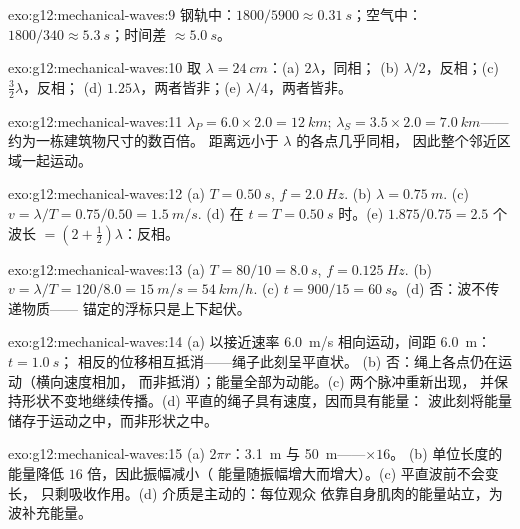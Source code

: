\begin{solution}{exo:g12:mechanical-waves:9}
钢轨中：$1800/5900 \approx \qty{0.31}{s}$；空气中：
$1800/340 \approx \qty{5.3}{s}$；时间差 $\approx \qty{5.0}{s}$。
\end{solution}

\begin{solution}{exo:g12:mechanical-waves:10}
取 $\lambda = \qty{24}{cm}$：(a) $2\lambda$，同相；
(b) $\lambda/2$，反相；(c) $\tfrac32\lambda$，反相；
(d) $1.25\lambda$，两者皆非；(e) $\lambda/4$，两者皆非。
\end{solution}

\begin{solution}{exo:g12:mechanical-waves:11}
$\lambda_P = 6.0 \times 2.0 = \qty{12}{km}$;
$\lambda_S = 3.5 \times 2.0 = \qty{7.0}{km}$——约为一栋建筑物尺寸的数百倍。
距离远小于 $\lambda$ 的各点几乎同相，
因此整个邻近区域一起运动。
\end{solution}

\begin{solution}{exo:g12:mechanical-waves:12}
(a) $T = \qty{0.50}{s}$, $f = \qty{2.0}{Hz}$.
(b) $\lambda = \qty{0.75}{m}$.
(c) $v = \lambda/T = 0.75/0.50 = \qty{1.5}{m/s}$.
(d) 在 $t = T = \qty{0.50}{s}$ 时。(e) $1.875/0.75 = 2.5$ 个
波长 $= (2 + \tfrac12)\lambda$：反相。
\end{solution}

\begin{solution}{exo:g12:mechanical-waves:13}
(a) $T = 80/10 = \qty{8.0}{s}$, $f = \qty{0.125}{Hz}$.
(b) $v = \lambda/T = 120/8.0 = \qty{15}{m/s} = \qty{54}{km/h}$.
(c) $t = 900/15 = \qty{60}{s}$。(d) 否：波不传递物质——
锚定的浮标只是上下起伏。
\end{solution}

\begin{solution}{exo:g12:mechanical-waves:14}
(a) 以接近速率 \qty{6.0}{m/s} 相向运动，间距 \qty{6.0}{m}：$t = \qty{1.0}{s}$；
相反的位移相互抵消——绳子此刻呈平直状。
(b) 否：绳上各点仍在运动（横向速度相加，
而非抵消）；能量全部为动能。(c) 两个脉冲重新出现，
并保持形状不变地继续传播。(d) 平直的绳子具有速度，因而具有能量：
波此刻将能量储存于运动之中，而非形状之中。
\end{solution}

\begin{solution}{exo:g12:mechanical-waves:15}
(a) $2\pi r$：\qty{3.1}{m} 与 \qty{50}{m}——$\times 16$。
(b) 单位长度的能量降低 $16$ 倍，因此振幅减小（
能量随振幅增大而增大）。(c) 平直波前不会变长，
只剩吸收作用。(d) 介质是主动的：每位观众
依靠自身肌肉的能量站立，为波补充能量。
\end{solution}

